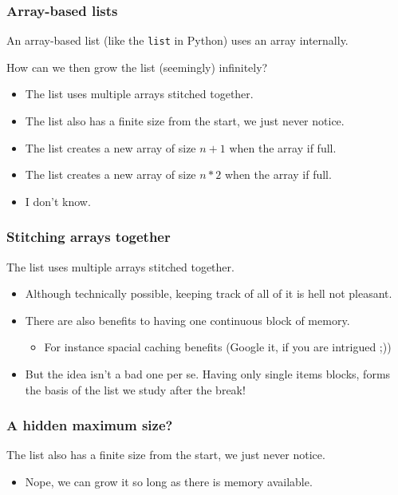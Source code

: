 \begin{frame}
	\frametitle{Array-based lists}

		An array-based list (like the \texttt{list} in Python) uses an array internally.

		How can we then grow the list (seemingly) infinitely?
		\begin{itemize}
			\item The list uses multiple arrays stitched together.
			\item The list also has a finite size from the start, we just never notice.
			\item The list creates a new array of size $n+1$ when the array if full.
			\item The list creates a new array of size $n*2$ when the array if full.
			\item I don't know.
		\end{itemize}

\end{frame}

\begin{frame}
	\frametitle{Stitching arrays together}
		The list uses multiple arrays stitched together.
		\begin{itemize}
			\item Although technically possible, keeping track of all of it is hell not pleasant.
			\item There are also benefits to having one continuous block of memory.
				\begin{itemize}
					\item For instance spacial caching benefits (Google it, if you are intrigued ;))
				\end{itemize}
				
			\item But the idea isn't a bad one per se. Having only single items blocks, forms the basis of the list we study
				after the break!
		\end{itemize}
\end{frame}

\begin{frame}
	\frametitle{A hidden maximum size?}
		The list also has a finite size from the start, we just never notice.
		\begin{itemize}
			\item Nope, we can grow it so long as there is memory available.
		\end{itemize}
\end{frame}

